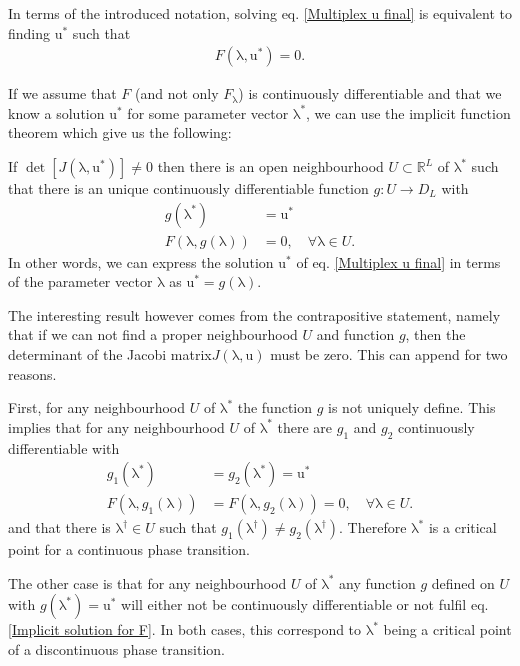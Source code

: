 \documentclass[
11pt, %
english, %
singlespacing, %
liststotoc, %
headsepline, %
]{MastersDoctoralThesis} %
\newcommand{\myvec}[1]{\boldsymbol{\mathrm{#1}}} %
\newcommand{\lambdavec}{\myvec{\lambda}}
\newcommand{\uvec}{\myvec{u}}
\begin{document}
In terms of the introduced notation, solving eq. \eqref{Multiplex u final} is equivalent to finding $\uvec^*$ such that
\begin{align}
	F(\lambdavec, \uvec^*) = 0.
\end{align}

If we assume that $F$ (and not only $F_{\lambdavec}$) is continuously differentiable and that we know a solution $\uvec^*$ for some parameter vector $\lambdavec^*$, we can use the implicit function theorem which give us the following:

If $\det\left[ J(\lambdavec, \uvec^*) \right] \neq 0$ then there is an open neighbourhood $U \subset \mathbb{R}^L$ of $\lambdavec^*$ such that there is an unique continuously differentiable function $g : U \rightarrow D_L$ with
\begin{align}
	g(\lambdavec^*) &= \uvec^* \\
	F(\lambdavec, g(\lambdavec)) &= 0, \quad \forall \lambdavec \in U. \label{Implicit solution for F}
\end{align}
In other words, we can express the solution $\uvec^*$ of eq. \eqref{Multiplex u final} in terms of the parameter vector $\lambdavec$ as $\uvec^* = g(\lambdavec)$.

The interesting result however comes from the contrapositive statement, namely that if we can not find a proper neighbourhood $U$ and function $g$, then the determinant of the Jacobi matrix$J(\lambdavec, \uvec)$ must be zero. This can append for two reasons.

First, for any neighbourhood $U$ of $\lambdavec^*$ the function $g$ is not uniquely define. This implies that for any neighbourhood $U$ of $\lambdavec^*$ there are  $g_1$ and $g_2$ continuously differentiable with
\begin{align}
	g_1(\lambdavec^*) &= g_2(\lambdavec^*) = \uvec^* \\
	F(\lambdavec, g_1(\lambdavec)) &= F(\lambdavec, g_2(\lambdavec)) =  0, \quad \forall \lambdavec \in U.
\end{align}
and that there is $\myvec{\lambda^\dagger} \in U$ such that $g_1(\myvec{\lambda^\dagger}) \neq g_2(\myvec{\lambda^\dagger})$. Therefore $\lambdavec^*$ is a critical point for a continuous phase transition. 

The other case is that for any neighbourhood $U$ of $\lambdavec^*$ any function $g$ defined on $U$ with $g(\lambdavec^*) = \uvec^*$ will either not be continuously differentiable or not fulfil eq. \eqref{Implicit solution for F}. In both cases, this correspond to $\lambdavec^*$ being a critical point of a discontinuous phase transition.
\end{document}
